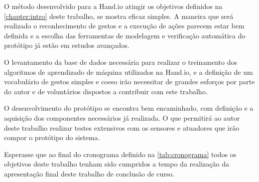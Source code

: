 \label{chapter:consi}

O método desenvolvido para a Hand.io atingir os objetivos definidos na \autoref{chapter:intro} deste trabalho, se mostra eficaz simples. A maneira que será realizado o reconhecimento de gestos e a execução de ações parecem estar bem definida e a escolha das ferramentas de modelagem e verificação automática do protótipo já estão em estudos avançados. 

O levantamento da base de dados necessária para realizar o treinamento dos algoritmos de aprendizado de máquina utilizados na Hand.io, e a definição de um vocabulário de gestos simples e coeso irão necessitar de grandes esforços por parte do autor e de voluntários dispostos a contribuir com este trabalho. 

O desenvolvimento do protótipo se encontra bem encaminhado, com definição e a aquisição dos componentes necessários já realizada. O que permitirá ao autor deste trabalho realizar testes extensivos com os sensores e atuadores que irão compor o protótipo do sistema.

Esperasse que ao final do cronograma definido na \autoref{tab:cronograma} todos os objetivos deste trabalho tenham sido cumpridos a tempo da realização da apresentação final deste trabalho de conclusão de curso.
